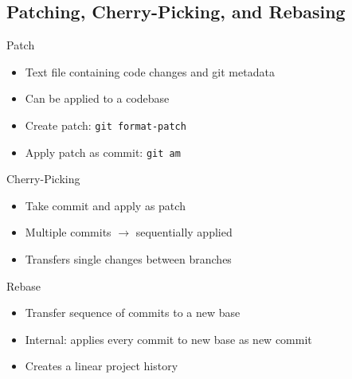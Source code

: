\subsection{Patching, Cherry-Picking, and Rebasing}
\begin{frame}{\insertsubsection}
	\begin{fancycolumns}[animation=none]
		{\small 
		\begin{definition}{Patch}
			\begin{itemize}
				\item Text file containing code changes and git metadata
				\item Can be applied to a codebase
				\item Create patch: \texttt{git format-patch}
				\item Apply patch as commit: \texttt{git am}
			\end{itemize}
		\end{definition}\pause
		\begin{definition}{Cherry-Picking}
			\begin{itemize}
				\item Take commit and apply as patch
				\item Multiple commits $\rightarrow$ sequentially applied
				\item Transfers single changes between branches
			\end{itemize}
		\end{definition}\pause
		\begin{definition}{Rebase}
			\begin{itemize}
				\item Transfer sequence of commits to a new base 
				\item Internal: applies every commit to new base as new commit
				\item Creates a linear project history
			\end{itemize}
		\end{definition}\pause
		}
		\nextcolumn
		\begin{center}
		

\end{center}
\end{fancycolumns}
\end{frame}
